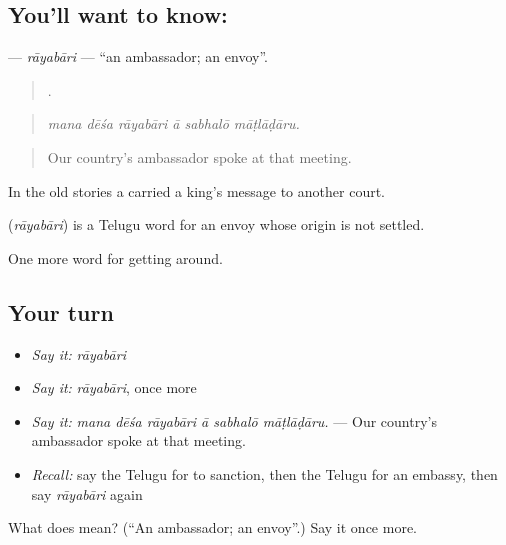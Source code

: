 \subsection*{You'll want to know: }
\textbf{} — \emph{rāyabāri} — \textquotedblleft{}an ambassador; an envoy\textquotedblright{}.

\begin{quote}
     .
\end{quote}

\begin{quote}
\emph{mana dēśa rāyabāri ā sabhalō māṭlāḍāru.}
\end{quote}

\begin{quote}
Our country's ambassador spoke at that meeting.
\end{quote}

In the old stories a  carried a king's message to another court.

\begin{cousinweb}
\textbf{} (\emph{rāyabāri}) is a Telugu word for an envoy whose origin is not settled.
\end{cousinweb}

\begin{grammarlens}[title={What you've built}]
One more word for getting around.
\end{grammarlens}

\subsection*{Your turn}
\begin{itemize}
\raggedright
  \item \emph{Say it:} \emph{rāyabāri}
  \item \emph{Say it:} \emph{rāyabāri}, once more
  \item \emph{Say it:} \emph{mana dēśa rāyabāri ā sabhalō māṭlāḍāru.} — Our country's ambassador spoke at that meeting.
  \item \emph{Recall:} say the Telugu for to sanction, then the Telugu for an embassy, then say \emph{rāyabāri} again
\end{itemize}

\begin{tcolorbox}[breakable,colback=teal!4,colframe=teal!35!black,title={Before you move on}]
What does  mean? (\textquotedblleft{}An ambassador; an envoy\textquotedblright{}.) Say it once more.
\end{tcolorbox}
